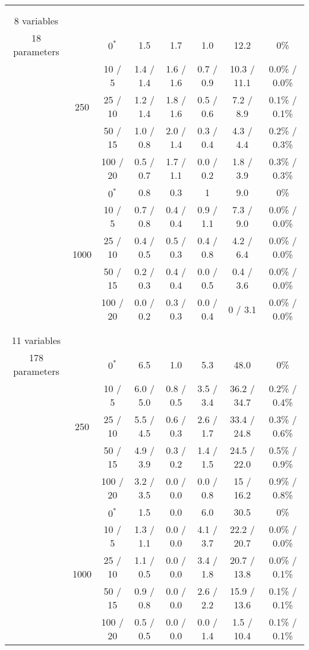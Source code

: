 \documentclass[twoside,11pt]{article}
\begin{document}
\begin{table}[H]
\begin{tabular}{ c | c | c || c | c | c | c | c  }
\hhline{=|=|=||=|=|=|=|=}
\multirow{10}{*}{\thead{\textbf{asia} \\ \\ 8 variables \\ 18 parameters}} & \multirow{5}{*}{250} 
& $0^*$ & 1.5 & 1.7 & 1.0 & 12.2 & 0\% \\
& & 10 / 5 & 1.4 / 1.4 & 1.6 / 1.6 & 0.7 / 0.9 & 10.3 / 11.1 & 0.0\% / 0.0\% \\
& & 25 / 10 & 1.2 / 1.4 & 1.8 / 1.6 & 0.5 / 0.6 & 7.2 / 8.9 & 0.1\% / 0.1\% \\
& & 50 / 15 & 1.0 / 0.8 & 2.0 / 1.4 & 0.3 / 0.4 & 4.3 / 4.4 & 0.2\% / 0.3\% \\
& & 100 / 20 & 0.5 / 0.7 & 1.7 / 1.1 & 0.0 / 0.2 & 1.8 / 3.9 & 0.3\% / 0.3\% \\

\hhline{~|-|-||-|-|-|-|-} 
& \multirow{5}{*}{1000}
& $0^*$ & 0.8 & 0.3 & 1 & 9.0 & 0\% \\
& & 10 / 5 & 0.7 / 0.8 & 0.4 / 0.4 & 0.9 / 1.1 & 7.3 / 9.0 & 0.0\% / 0.0\% \\
& & 25 / 10 & 0.4 / 0.5 & 0.5 / 0.3 & 0.4 / 0.8 & 4.2 / 6.4 & 0.0\% / 0.0\% \\
& & 50 / 15 & 0.2 / 0.3 & 0.4 / 0.4 & 0.0 / 0.5 & 0.4 / 3.6 & 0.0\% / 0.0\% \\
& & 100 / 20 & 0.0 / 0.2 & 0.3 / 0.3 & 0.0 / 0.4 & 0 / 3.1 & 0.0\% / 0.0\% \\

\hhline{=|=|=||=|=|=|=|=}
\multirow{10}{*}{\thead{\textbf{sachs} \\ \\ 11 variables \\ 178 parameters}} & \multirow{5}{*}{250} 
& $0^*$ & 6.5 & 1.0 & 5.3 & 48.0 & 0\% \\
& & 10 / 5 & 6.0 / 5.0 & 0.8 / 0.5 & 3.5 / 3.4 & 36.2 / 34.7 & 0.2\% / 0.4\% \\
& & 25 / 10 & 5.5 / 4.5 & 0.6 / 0.3 & 2.6 / 1.7 & 33.4 / 24.8 & 0.3\% / 0.6\% \\
& & 50 / 15 & 4.9 / 3.9 & 0.3 / 0.2 & 1.4 / 1.5 & 24.5 / 22.0 & 0.5\% / 0.9\% \\
& & 100 / 20 & 3.2 / 3.5 & 0.0 / 0.0 & 0.0 / 0.8 & 15 / 16.2 & 0.9\% / 0.8\% \\

\hhline{~|-|-||-|-|-|-|-} 
& \multirow{5}{*}{1000}
& $0^*$ & 1.5 & 0.0 & 6.0 & 30.5 & 0\% \\
& & 10 / 5 & 1.3 / 1.1 & 0.0 / 0.0 & 4.1 / 3.7 & 22.2 / 20.7 & 0.0\% / 0.0\% \\
& & 25 / 10 & 1.1 / 0.5 & 0.0 / 0.0 & 3.4 / 1.8 & 20.7 / 13.8 & 0.0\% / 0.1\% \\
& & 50 / 15 & 0.9 / 0.8 & 0.0 / 0.0 & 2.6 / 2.2 & 15.9 / 13.6 & 0.1\% / 0.1\% \\
& & 100 / 20 & 0.5 / 0.5 & 0.0 / 0.0 & 0.0 / 1.4 & 1.5 / 10.4 & 0.1\% / 0.1\% \\

\end{tabular}
\end{table}
\end{document}
